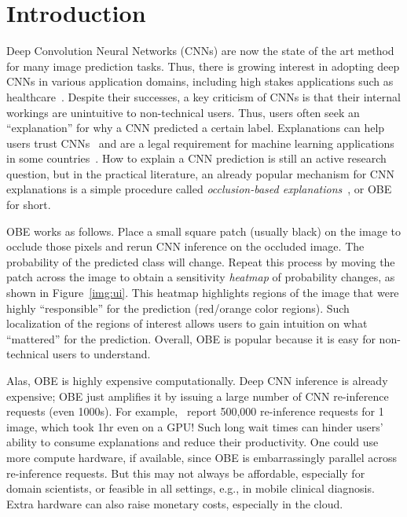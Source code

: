 \documentclass{vldb}
\begin{document}
\section{Introduction}\label{introduction}
Deep Convolution Neural Networks (CNNs) are now the state of the art method for many image prediction tasks. Thus, there is growing interest in adopting deep CNNs in various application domains, including high stakes applications such as healthcare~\cite{fdaretinopathy,kermany2018identifying}.
Despite their successes, a key criticism of CNNs is that their internal workings are unintuitive to non-technical users. Thus, users often seek an ``explanation'' for why a CNN predicted a certain label. Explanations can help users trust CNNs~\cite{ribeiro2016should} and are a legal requirement for machine learning applications in some countries~\cite{gdpr}. How to explain a CNN prediction is still an active research question, but in the practical literature, an already popular mechanism for CNN explanations is a simple procedure called \textit{occlusion-based explanations}~\cite{zeiler2014visualizing}, or OBE for short.

OBE works as follows. Place a small square patch (usually black) on the image to occlude those pixels and rerun CNN inference on the occluded image. The probability of the predicted class will change. Repeat this process by moving the patch across the image to obtain a sensitivity \textit{heatmap} of probability changes, as shown in Figure~\ref{img:ui}. This heatmap highlights regions of the image that were highly ``responsible'' for the prediction (red/orange color regions). Such localization of the regions of interest allows users to gain intuition on what ``mattered'' for the prediction.
Overall, OBE is popular because it is easy for non-technical users to understand.

Alas, OBE is highly expensive computationally. Deep CNN inference is already expensive; OBE just amplifies it by issuing a large number of CNN re-inference requests (even 1000s). For example,~\cite{zintgraf2017visualizing} report 500,000 re-inference requests for 1 image, which took 1hr even on a GPU! Such long wait times can hinder users' ability to consume explanations and reduce their productivity. One could use more compute hardware, if available, since OBE is embarrassingly parallel across re-inference requests. But this may not always be affordable, especially for domain scientists, or feasible in all settings, e.g., in mobile clinical diagnosis. Extra hardware can also raise monetary costs, especially in the cloud.
\end{document}
